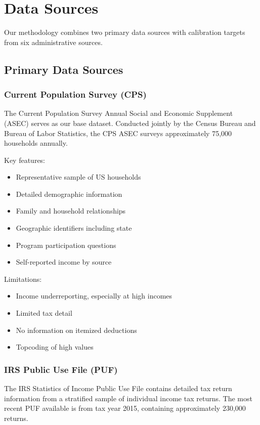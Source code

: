 \section{Data Sources}

Our methodology combines two primary data sources with calibration targets from six administrative sources.

\subsection{Primary Data Sources}

\subsubsection{Current Population Survey (CPS)}

The Current Population Survey Annual Social and Economic Supplement (ASEC) serves as our base dataset. Conducted jointly by the Census Bureau and Bureau of Labor Statistics, the CPS ASEC surveys approximately 75,000 households annually.

Key features:
\begin{itemize}
\item Representative sample of US households
\item Detailed demographic information
\item Family and household relationships
\item Geographic identifiers including state
\item Program participation questions
\item Self-reported income by source
\end{itemize}

Limitations:
\begin{itemize}
\item Income underreporting, especially at high incomes
\item Limited tax detail
\item No information on itemized deductions
\item Topcoding of high values
\end{itemize}

\subsubsection{IRS Public Use File (PUF)}

The IRS Statistics of Income Public Use File contains detailed tax return information from a stratified sample of individual income tax returns. The most recent PUF available is from tax year 2015, containing approximately 230,000 returns.

